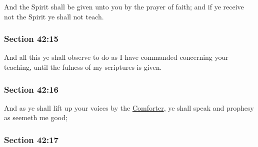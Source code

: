 		And the Spirit shall be given unto you by the prayer of faith; and if ye receive not the Spirit ye shall not teach.


	\subsubsection{Section 42:15} %
		\label{DC42-15}

		And all this ye shall observe to do as I have commanded concerning your teaching, until the fulness of my scriptures is given.


	\subsubsection{Section 42:16} %
		\label{DC42-16}

		And as ye shall lift up your voices by the \hyperref[COMFORTER]{Comforter}, ye shall speak and prophesy as seemeth me good;


	\subsubsection{Section 42:17} %
		\label{DC42-17}

